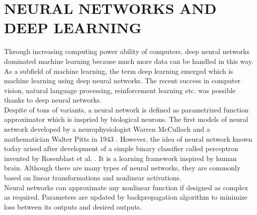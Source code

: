 \chapter{NEURAL NETWORKS AND DEEP LEARNING}
\label{chap:dnns}

Through increasing computing power ability of computers, deep neural networks dominated machine learning because much more data can be handled in this way. As a subfield of machine learning, the term deep learning emerged which is machine learning using deep neural networks. The recent success in computer vision, natural language processing, reinforcement learning etc. was possible thanks to deep neural networks. \\
Despite of tons of variants, a neural network is defined as parametrized function approximator which is inspried by biological neurons. The first models of neural network developed by a neurophysiologist Warren McCulloch and a mathematician Walter Pitts in 1943 \cite{mcculloch_logical_1943}. However, the idea of neural network known today arised after development of a simple binary classifier called perceptron invented by Rosenblast et al. \cite{rosenblatt_perceptron_1958}. It is a learning framework inspired by human brain. Although there are many types of neural networks, they are commonly based on linear transformations and nonlinear activations.\\
Neural networks can approximate any nonlinear function if designed as complex as required. Parameters are updated by backpropagation algorithm to minimize loss between its outputs and desired outputs.
